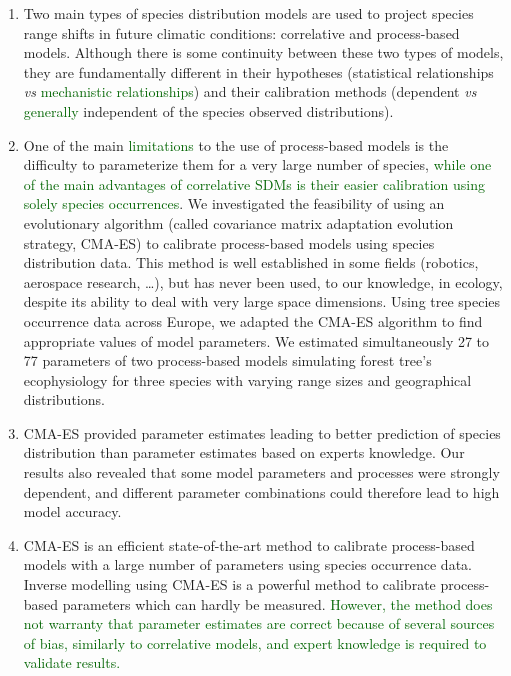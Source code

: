 \documentclass[11pt,]{article}
\renewenvironment{abstract}
 {{%
    \setlength{\leftmargin}{0mm}
    \setlength{\rightmargin}{\leftmargin}%
  }%
  \relax}
 {\endlist}
\begin{document}
\begin{abstract}

    \hbox{\vrule height .2pt width 39.14pc}

    \vskip 8.5pt %

\noindent \begin{enumerate}
\def\labelenumi{\arabic{enumi}.}
\item
  Two main types of species distribution models are used to project
  species range shifts in future climatic conditions: correlative and
  process-based models. Although there is some continuity between these
  two types of models, they are fundamentally different in their
  hypotheses (statistical relationships \emph{vs}
  \textcolor{darkgreen}{mechanistic relationships}) and their
  calibration methods (dependent \emph{vs}
  \textcolor{darkgreen}{generally} independent of the species observed
  distributions).
\item
  One of the main \textcolor{darkgreen}{limitations} to the use of
  process-based models is the difficulty to parameterize them for a very
  large number of species,
  \textcolor{darkgreen}{while one of the main advantages of correlative SDMs is their easier calibration using solely species occurrences}.
  We investigated the feasibility of using an evolutionary algorithm
  (called covariance matrix adaptation evolution strategy, CMA-ES) to
  calibrate process-based models using species distribution data. This
  method is well established in some fields (robotics, aerospace
  research, \ldots), but has never been used, to our knowledge, in
  ecology, despite its ability to deal with very large space dimensions.
  Using tree species occurrence data across Europe, we adapted the
  CMA-ES algorithm to find appropriate values of model parameters. We
  estimated simultaneously 27 to 77 parameters of two process-based
  models simulating forest tree's ecophysiology for three species with
  varying range sizes and geographical distributions.
\item
  CMA-ES provided parameter estimates leading to better prediction of
  species distribution than parameter estimates based on experts
  knowledge. Our results also revealed that some model parameters and
  processes were strongly dependent, and different parameter
  combinations could therefore lead to high model accuracy.
\item
  CMA-ES is an efficient state-of-the-art method to calibrate
  process-based models with a large number of parameters using species
  occurrence data. Inverse modelling using CMA-ES is a powerful method
  to calibrate process-based parameters which can hardly be measured.
  \textcolor{darkgreen}{However, the method does not warranty that parameter estimates are correct because of several sources of bias, similarly to correlative models, and expert knowledge is required to validate results.}
\end{enumerate}



\end{abstract}
\end{document}
